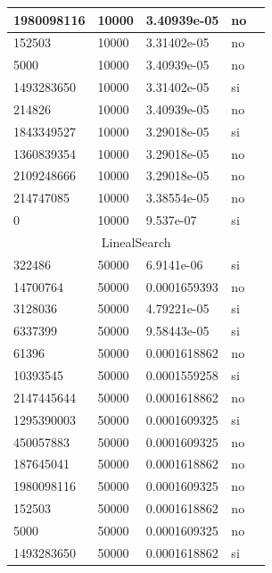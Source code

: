 \documentclass[12pt, fleqn]{article}                             %
\theoremstyle{break}                                            %
\begin{document}
\begin{longtable}{|m{5em}|m{5em}|m{10em}|m{5em}|@{}m{0pt}@{}}
            1980098116& 10000  & 3.40939e-05 & no &\\[1em]    \hline
            152503& 10000  & 3.31402e-05 & no &\\[1em]    \hline
            5000& 10000  & 3.40939e-05 & no &\\[1em]    \hline
            1493283650& 10000  & 3.31402e-05 & si &\\[1em]    \hline
            214826& 10000  & 3.40939e-05 & no &\\[1em]    \hline
            1843349527& 10000  & 3.29018e-05 & si &\\[1em]    \hline
            1360839354& 10000  & 3.29018e-05 & no &\\[1em]    \hline
            2109248666& 10000  & 3.29018e-05 & no &\\[1em]    \hline
            214747085& 10000  & 3.38554e-05 & no &\\[1em]    \hline
            0& 10000  & 9.537e-07 & si &\\[1em]    \hline
            \multicolumn{5}{|c|}{LinealSearch}   \\          \hline
            322486& 50000  & 6.9141e-06 & si &\\[1em]    \hline
            14700764& 50000  & 0.0001659393 & no &\\[1em]    \hline
            3128036& 50000  & 4.79221e-05 & si &\\[1em]    \hline
            6337399& 50000  & 9.58443e-05 & si &\\[1em]    \hline
            61396& 50000  & 0.0001618862 & no &\\[1em]    \hline
            10393545& 50000  & 0.0001559258 & si &\\[1em]    \hline
            2147445644& 50000  & 0.0001618862 & no &\\[1em]    \hline
            1295390003& 50000  & 0.0001609325 & si &\\[1em]    \hline
            450057883& 50000  & 0.0001609325 & no &\\[1em]    \hline
            187645041& 50000  & 0.0001618862 & no &\\[1em]    \hline
            1980098116& 50000  & 0.0001609325 & no &\\[1em]    \hline
            152503& 50000  & 0.0001618862 & no &\\[1em]    \hline
            5000& 50000  & 0.0001609325 & no &\\[1em]    \hline
            1493283650& 50000  & 0.0001618862 & si &\\[1em]    \hline

\end{longtable}
\end{document}
